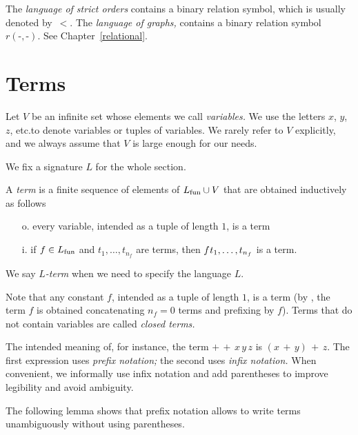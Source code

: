 \begin{example}\label{expl_graph1}
The \emph{language of strict orders\/} contains a binary relation symbol, which is usually denoted by~$<$.
The \emph{language of graphs,} contains a binary relation symbol~$r(\mbox{-},\mbox{-})$.
See Chapter~\ref{relational}.
\end{example}


\section{Terms}\label{terms}
Let \emph{$V$\/} be an infinite set whose elements we call \emph{variables.}
We use the letters $x$, $y$, $z$, etc.\@ to denote variables or tuples of variables.
We rarely refer to $V$ explicitly, and we always assume that $V$ is large enough for our needs.

We fix a signature $L$ for the whole section.

\begin{definition}\label{deftermine} 
A \emph{term\/} is a finite sequence of elements of $L_{\rm fun}\cup V$ that are obtained inductively as follows
\begin{itemize}
\item[o.] every variable, intended as a tuple of length $1$, is a term
\item[i.] if $f\in L_{\rm fun}$ and $t_1,\dots,t_{n_f}$ are terms, then $f\kern0.1ex t_1,\dots,t_{n_f}$ is a term.
\end{itemize}
We say \emph{$L$-term\/} when we need to specify the language $L$.
\end{definition}

Note that any constant $f$, intended as a tuple of length $1$, is a term (by , the term $f$ is obtained concatenating $n_f=0$ terms and prefixing by $f$). Terms that do not contain variables are called \emph{closed terms.}

The intended meaning of, for instance, the term ${+}\,{+}\,x\,y\,z$ is $(x\,{+}\,y)\,{+}\,z$.
The first expression uses \emph{prefix notation;} the second uses \emph{infix notation.} When convenient, we informally use infix notation and add parentheses to improve legibility and avoid ambiguity.

The following lemma shows that prefix notation allows to write terms unambiguously without using parentheses.

